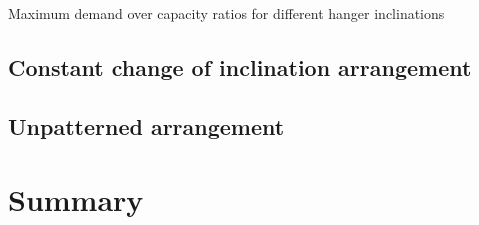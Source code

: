 \begin{table}[H]
    \centering
    \caption{Maximum demand over capacity ratios for different hanger inclinations}
    \label{tab:cost_inclination}
    
\end{table}


\subsection{Constant change of inclination arrangement}

\subsection{Unpatterned arrangement}



\section{Summary}











